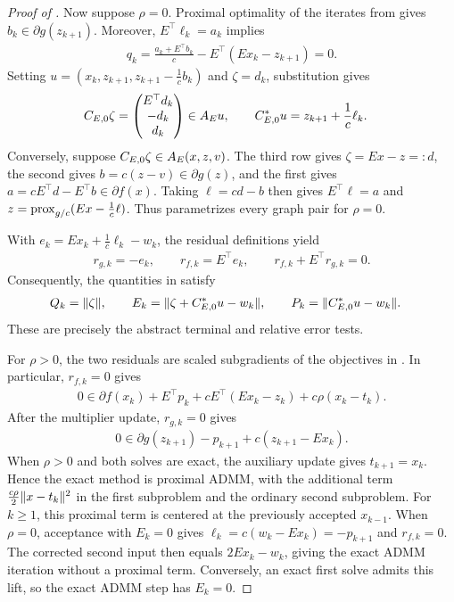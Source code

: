 \documentclass[11pt]{article}
\begin{document}
\begin{proof}[Proof of ]
    Now suppose $\rho=0$.
    Proximal optimality of the iterates from  gives $b_k\in\partial g(z_{k+1})$.
    Moreover, $E^\top\ell_k=a_k$ implies
    \begin{align}
        q_k=\frac{a_k+E^\top b_k}{c}-E^\top(Ex_k-z_{k+1})=0.
    \end{align}
    Setting $u=(x_k,z_{k+1},z_{k+1}-\frac{1}{c}b_k)$ and $\zeta=d_k$, substitution gives
    \begin{align}
        {C}_{E,0}\zeta
        &=\begin{pmatrix}E^\top d_k\\-d_k\\d_k\end{pmatrix}\in{A}_Eu,
        \qquad {C}_{E,0}^*u=z_{k+1}+ \frac{1}{c}\ell_k .
    \end{align}
    Conversely, suppose ${C}_{E,0}\zeta\in{A}_E(x,z,v)$.
    The third row gives $\zeta=Ex-z=:d$, the second gives $b=c(z-v)\in\partial g(z)$, and the first gives $a=cE^\top d-E^\top b\in\partial f(x)$.
    Taking $\ell=cd-b$ then gives $E^\top\ell=a$ and $z=\mathrm{prox}_{g/c}(Ex-\frac{1}{c} \ell )$.
    Thus  parametrizes every graph pair for $\rho=0$.

    With $e_k=Ex_k+ \frac{1}{c}\ell_k -w_k$, the residual definitions yield
    \begin{align}
        r_{g,k}=-e_k,\qquad r_{f,k}=E^\top e_k,\qquad r_{f,k}+E^\top r_{g,k}=0.
    \end{align}
    Consequently, the quantities in  satisfy
    \begin{align}
        Q_k&=\lVert\zeta\rVert,\qquad
        E_k=\lVert\zeta+{C}_{E,0}^*u-w_k\rVert,\qquad
        P_k=\lVert{C}_{E,0}^*u-w_k\rVert.
    \end{align}
    These are precisely the abstract terminal and relative error tests.

    For $\rho>0$, the two residuals are scaled subgradients of the objectives in .
    In particular, $r_{f,k}=0$ gives
    \begin{align}
        0\in\partial f(x_k)+ E^\top p_k+c E^\top (Ex_k-z_k)+c\rho(x_k-t_k).
    \end{align}
    After the multiplier update, $r_{g,k}=0$ gives
    \begin{align}
        0\in\partial g(z_{k+1})-p_{k+1}+c(z_{k+1}-Ex_k).
    \end{align}
    When $\rho>0$ and both solves are exact, the auxiliary update gives $t_{k+1}=x_k$.
    Hence the exact method is proximal ADMM, with the additional term $\frac{c\rho}{2}\lVert x-t_k\rVert^2$ in the first subproblem and the ordinary second subproblem.
    For $k\geq1$, this proximal term is centered at the previously accepted $x_{k-1}$.
    When $\rho=0$, acceptance with $E_k=0$ gives $\ell_k=c(w_k-Ex_k)=-p_{k+1}$ and $r_{f,k}=0$.
    The corrected second input then equals $2Ex_k-w_k$, giving the exact ADMM iteration without a proximal term.
    Conversely, an exact first solve admits this lift, so the exact ADMM step has $E_k=0$.


\end{proof}
\end{document}
